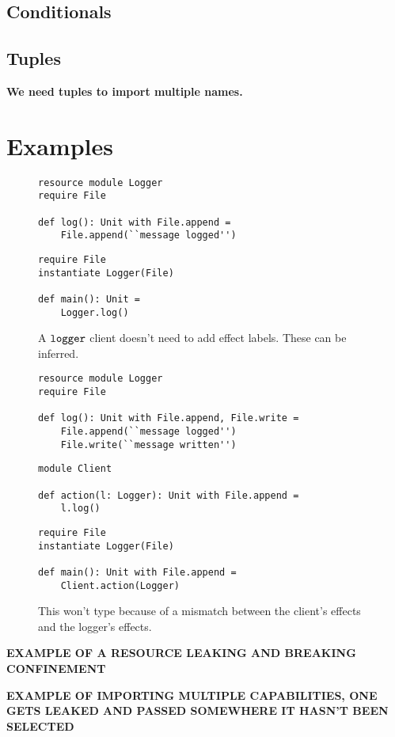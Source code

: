 \subsection{Conditionals}

\subsection{Tuples}

\textbf{We need tuples to import multiple names.}


\section{Examples}




\begin{figure}[h]

\begin{lstlisting}
resource module Logger
require File

def log(): Unit with File.append =
    File.append(``message logged'')
\end{lstlisting}

\begin{lstlisting}
require File
instantiate Logger(File)

def main(): Unit =
    Logger.log()
\end{lstlisting}

\caption{A $\mathtt{logger}$ client doesn't need to add effect labels. These can be inferred.}
\label{This is the label.}
\end{figure}



\begin{figure}[h]

\begin{lstlisting}
resource module Logger
require File

def log(): Unit with File.append, File.write =
    File.append(``message logged'')
    File.write(``message written'')
\end{lstlisting}

\begin{lstlisting}
module Client

def action(l: Logger): Unit with File.append =
    l.log()
\end{lstlisting}

\begin{lstlisting}
require File
instantiate Logger(File)

def main(): Unit with File.append =
    Client.action(Logger)
\end{lstlisting}

\caption{This won't type because of a mismatch between the client's effects and the logger's effects.}
\label{This is the label.}
\end{figure}



\textbf{EXAMPLE OF A RESOURCE LEAKING AND BREAKING CONFINEMENT}

\textbf{EXAMPLE OF IMPORTING MULTIPLE CAPABILITIES, ONE GETS LEAKED AND PASSED SOMEWHERE IT HASN'T BEEN SELECTED}

